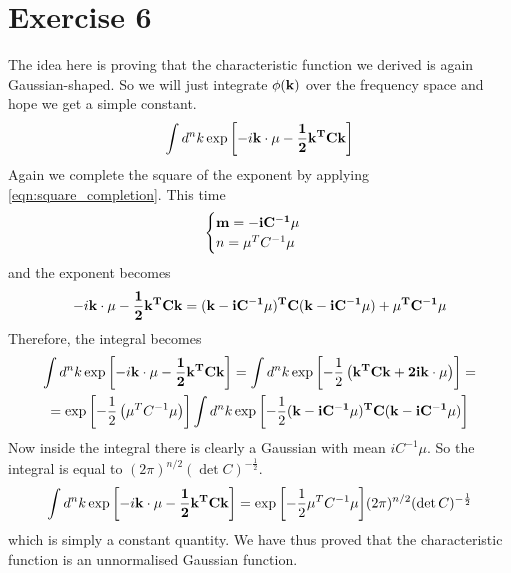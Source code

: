 \documentclass[a4paper,11pt,fleqn]{article}
\begin{document}
\section{Exercise 6}
The idea here is proving that the characteristic function we derived is again Gaussian-shaped.
So we will just integrate $\phi(\bf{k})$ over the frequency space and hope
we get a simple constant.
\begin{equation*}
    \int d^nk \exp{\left[-i\bf{k}\cdot\bf{\mu}-\frac{1}{2}\bf{k}^TC\bf{k}\right]}
\end{equation*}
Again we complete the square of the exponent by applying \ref{eqn:square_completion}.
This time 
\begin{gather*}
    \begin{cases}
        \bf{m} = -iC^{-1}\bf{\mu} \\
        n = \mu^TC^{-1}\mu
    \end{cases}
\end{gather*}
and the exponent becomes
\begin{gather*}
    -i\bf{k}\cdot\bf{\mu}-\frac{1}{2}\bf{k}^TC\bf{k} = (\bf{k}-iC^{-1}\bf{\mu})^TC (\bf{k}-iC^{-1}\bf{\mu}) + \mu^T C^{-1}\bf{\mu}
\end{gather*}
Therefore, the integral becomes 
\begin{gather*}
    \int d^nk \exp{\left[-i\bf{k}\cdot\bf{\mu}-\frac{1}{2}\bf{k}^TC\bf{k}\right]} = \int d^nk \exp{\left[-\frac{1}{2}\left(\bf{k}^TC\bf{k} + 2 i\bf{k}\cdot\bf{\mu} \right)\right]} =\\ 
    = \exp{\left[-\frac{1}{2}\left(\mu^T C^{-1}\mu\right) \right]}\int d^n k \exp{\left[-\frac{1}{2}(\bf{k}-iC^{-1}\bf{\mu})^TC (\bf{k}-iC^{-1}\bf{\mu})\right]}
\end{gather*}
Now inside the integral there is clearly a Gaussian with mean $iC^{-1}\mu$. So the integral
is equal to $(2\pi)^{n/2}(\det{C})^{-\frac{1}{2}}$.
\begin{gather*}
    \int d^nk \exp{\left[-i\bf{k}\cdot\bf{\mu}-\frac{1}{2}\bf{k}^TC\bf{k}\right]} = \exp{\left[-\frac{1}{2}\mu^T C^{-1}\mu \right]} (2\pi)^{n/2}(\det{C})^{-\frac{1}{2}}
\end{gather*}
which is simply a constant quantity. We have thus proved that the characteristic
function is an unnormalised Gaussian function.
\end{document}
